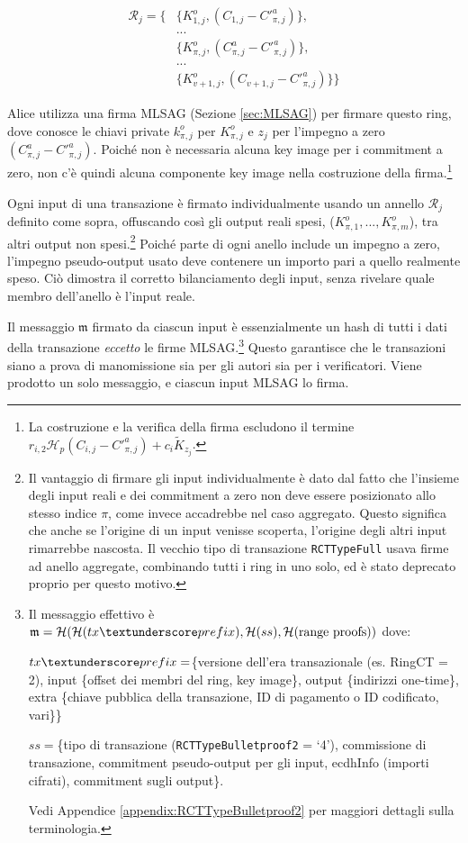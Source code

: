 \begin{align*}
    \mathcal{R}_j = \{&\{K^o_{1, j}, (C_{1, j} - C'^a_{\pi, j})\}, \\
    &... \\
    &\{ K^o_{\pi, j}, (C^a_{\pi, j} - C'^a_{\pi, j})\}, \\
    &... \\
    &\{ K^o_{v+1, j}, (C_{v+1, j} - C'^a_{\pi, j})\}\}
\end{align*}

Alice utilizza una firma MLSAG (Sezione \ref{sec:MLSAG}) per firmare questo ring, dove conosce le chiavi private $k^o_{\pi,j}$ per $K^o_{\pi,j}$ e $z_j$ per l’impegno a zero $(C^a_{\pi,j} - C'^a_{\pi,j})$. Poiché non è necessaria alcuna key image per i commitment a zero, non c'è quindi alcuna componente key image nella costruzione della firma.\footnote{La costruzione e la verifica della firma escludono il termine $r_{i,2} \mathcal{H}_p(C_{i, j} - C'^a_{\pi, j}) + c_i \tilde{K}_{z_j}$.}

Ogni input di una transazione è firmato individualmente usando un annello \(\mathcal{R}_j\) definito come sopra, offuscando così gli output reali spesi, ($K^o_{\pi,1},...,K^o_{\pi,m}$), tra altri output non spesi.\footnote{Il vantaggio di firmare gli input individualmente è dato dal fatto che l’insieme degli input reali e dei commitment a zero non deve essere posizionato allo stesso indice $\pi$, come invece accadrebbe nel caso aggregato. Questo significa che anche se l’origine di un input venisse scoperta, l’origine degli altri input rimarrebbe nascosta. Il vecchio tipo di transazione {\tt RCTTypeFull} usava firme ad anello aggregate, combinando tutti i ring in uno solo, ed è stato deprecato proprio per questo motivo.} Poiché parte di ogni anello include un impegno a zero, l’impegno pseudo-output usato deve contenere un importo pari a quello realmente speso. Ciò dimostra il corretto bilanciamento degli input, senza rivelare quale membro dell'anello è l’input reale.

Il messaggio $\mathfrak{m}$ firmato da ciascun input è essenzialmente un hash di tutti i dati della transazione {\em eccetto} le firme MLSAG.\footnote{Il messaggio effettivo è $\mathfrak{m} = \mathcal{H}(\mathcal{H}(tx\textunderscore prefix),\mathcal{H}(ss),\mathcal{H}(\text{range proofs}))$ dove:\par
$tx\textunderscore prefix = $\{versione dell’era transazionale (es. RingCT = 2), input \{offset dei membri del ring, key image\}, output \{indirizzi one-time\}, extra \{chiave pubblica della transazione, ID di pagamento o ID codificato, vari\}\}\par
$ss = $\{tipo di transazione ({\tt RCTTypeBulletproof2} = `4'), commissione di transazione, commitment pseudo-output per gli input, ecdhInfo (importi cifrati), commitment sugli output\}.\par
Vedi Appendice \ref{appendix:RCTTypeBulletproof2} per maggiori dettagli sulla terminologia.} Questo garantisce che le transazioni siano a prova di manomissione sia per gli autori sia per i verificatori. Viene prodotto un solo messaggio, e ciascun input MLSAG lo firma.

